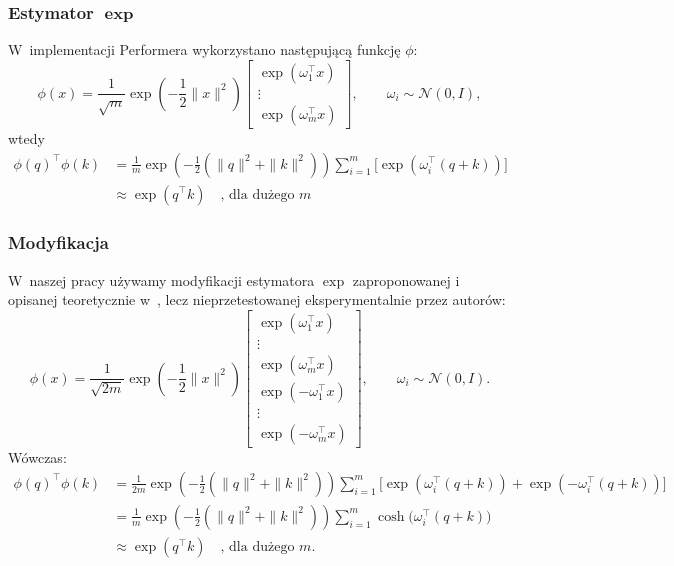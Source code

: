 \documentclass[a4paper,11pt,twoside]{report}
\theoremstyle{definition}
\begin{document}
\subsubsection{Estymator $\boldsymbol{\exp}$}
W~implementacji Performera wykorzystano następującą funkcję $\phi$:
\begin{equation}
\phi(x) = \frac{1}{\sqrt{m}}\exp\left(-\frac{1}{2}\|x\|^2\right)
\begin{bmatrix}
\exp(\omega_1^\top x) \\
\vdots \\
\exp(\omega_m^\top x)
\end{bmatrix},\qquad \omega_i \sim \mathcal{N}(0,I),
\end{equation}
wtedy
\begin{align}
\phi(q)^\top \phi(k)&=
\frac{1}{m} \exp\left(-\frac{1}{2}(\|q\|^2+\|k\|^2)\right)\sum_{i=1}^m\Big[\exp(\omega_i^\top (q+k))\Big] \\
&\approx \exp(q^\top k) \quad \text{, dla dużego~} m
\end{align}


\subsubsection{Modyfikacja}
W~naszej pracy używamy modyfikacji estymatora $\exp$ zaproponowanej i opisanej teoretycznie w~\cite{choromanski2021rethinking}, lecz nieprzetestowanej eksperymentalnie przez autorów:
\begin{equation}\label{eq:phicosh}
\phi(x) = \frac{1}{\sqrt{2m}}\exp\left(-\frac{1}{2}\|x\|^2\right)
\begin{bmatrix}
\exp(\omega_1^\top x) \\
\vdots \\
\exp(\omega_m^\top x) \\
\exp(-\omega_1^\top x) \\
\vdots \\
\exp(-\omega_m^\top x)
\end{bmatrix},\qquad \omega_i \sim \mathcal{N}(0,I).
\end{equation}
Wówczas:
\begin{equation}
\begin{aligned}
\phi(q)^\top \phi(k)&=
\frac{1}{2m} \exp\left(-\frac{1}{2}(\|q\|^2+\|k\|^2)\right)\sum_{i=1}^m\Big[\exp(\omega_i^\top (q+k))+\exp(-\omega_i^\top (q+k))\Big] \\
&= \frac{1}{m} \exp\left(-\frac{1}{2}(\|q\|^2+\|k\|^2)\right)\sum_{i=1}^m \cosh\big(\omega_i^\top(q+k)\big) \\
&\approx \exp(q^\top k) \quad \text{, dla dużego } m.
\end{aligned}
\end{equation}
\end{document}
